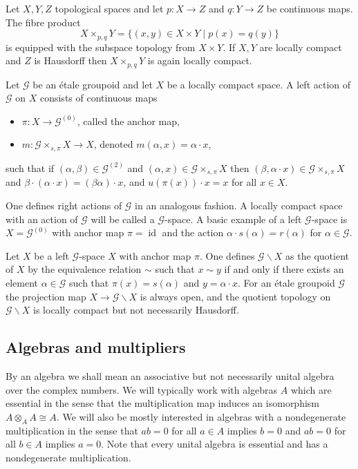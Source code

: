 \documentclass{amsart}
\newcommand{\G}{\mathcal{G}}
\DeclareMathOperator{\id}{id}
\begin{document}
Let $ X,Y,Z $ topological spaces and let $ p: X \rightarrow Z $ and $ q : Y \rightarrow Z $ be continuous maps. The fibre product
$$
X \times_{p,q} Y = \{(x,y) \in X \times Y \mid p(x) = q(y) \}
$$
is equipped with the subspace topology from $ X \times Y $. If $ X, Y $ are locally compact and $ Z $ is Hausdorff then $ X \times_{p,q} Y $ is again locally compact. 

Let $ \G $ be an \'etale groupoid and let $ X $ be a locally compact space. A left action of $ \G $ on $ X $ consists of continuous maps
\begin{itemize}
\item [(i)] $ \pi: X \rightarrow \G^{(0)} $, called the anchor map,
\item[(ii)] $ m: \G \times_{s,\pi} X \rightarrow X $, denoted $ m(\alpha,x) = \alpha \cdot x $,
\end{itemize}
such that if $ (\alpha, \beta) \in \G^{(2)} $ and $ (\alpha,x) \in \G \times_{s,\pi} X $ then $ (\beta, \alpha \cdot x) \in \G \times_{s,\pi} X $ and $ \beta \cdot (\alpha\cdot x) = (\beta\alpha)\cdot x $, and $ u(\pi(x)) \cdot x = x $ for all $ x \in X $. 

One defines right actions of $ \G $ in an analogous fashion. A locally compact space with an action of $ \G $ will be called a $ \G $-space. 
A basic example of a left $ \G $-space is $ X = \G^{(0)} $ with anchor map $ \pi = \id $ and the action $ \alpha \cdot s(\alpha) = r(\alpha) $ for $ \alpha \in \G $. 

Let $ X $ be a left $ \G $-space $ X $ with anchor map $ \pi $. One defines $ \G \backslash X $ as the quotient of $ X $ by the equivalence relation $ \sim $ such that $ x \sim y $ if and only if there exists an element $ \alpha \in \G $ such that $ \pi(x) = s(\alpha) $ and $ y = \alpha \cdot x $. For an \'etale groupoid $ \G $ the projection map $ X \rightarrow \G \backslash X $ is always open, and the quotient topology on $ \G \backslash X $ is locally compact but not necessarily Hausdorff. 


\subsection{Algebras and multipliers} 

By an algebra we shall mean an associative but not necessarily unital algebra over the complex numbers. We will typically work with algebras $ A $ which are essential in the sense that the multiplication map induces an isomorphism $ A \otimes_A A \cong A $. We will also be mostly interested in algebras with a nondegenerate multiplication in the sense that $ ab = 0 $ for all $ a \in A $ implies $ b = 0 $ and $ ab = 0 $ for all $ b \in A $ implies $ a = 0 $. Note that every unital algebra is essential and has a nondegenerate multiplication. 
\end{document}
